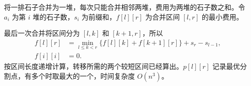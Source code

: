 将一排石子合并为一堆，每次只能合并相邻两堆，费用为两堆的石子数之和。令 $a_i$ 为第 $i$ 堆的石子数，$s_i$ 为前缀和，$f[l][r]$ 为合并区间 $[l,r]$ 的最小费用。

最后一次合并将区间分为 $[l,k]$ 和 $[k+1,r]$，所以
\[
\begin{aligned}
f[l][r]&=\min_{l\le k<r}\{f[l][k]+f[k+1][r]\}
          +s_r-s_{l-1},\\
f[i][i]&=0.
\end{aligned}
\]
按区间长度递增计算，转移所需的两个较短区间已经算出。$p[l][r]$ 记录最优分割点，有多个时取最大的一个，时间复杂度 $O(n^3)$。
